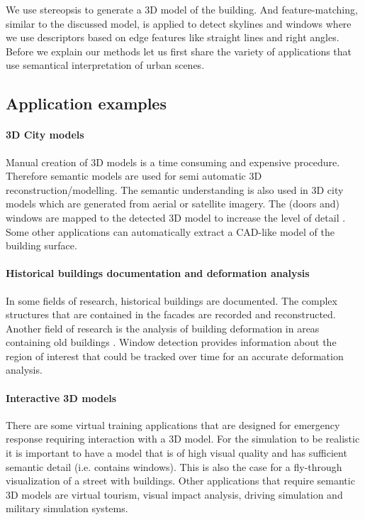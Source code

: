We use stereopsis to generate a 3D model of the building.  And feature-matching,
similar to the discussed model, is applied to detect skylines and windows where
we use descriptors based on edge features like straight lines and right angles.
Before we explain our methods let us first share the variety of applications 
that use semantical interpretation of urban scenes. 

\newpage
\subsection{Application examples}
\paragraph{3D City models} 
	Manual creation of 3D models is a time consuming and expensive procedure.
	Therefore semantic models are used for semi automatic 3D
	reconstruction/modelling.
	The semantic understanding is also used in 3D city models which are
	generated from aerial or satellite imagery.  The (doors and) windows are mapped to the detected 3D model to increase the level of detail \cite{Muller_procedural2}. 
	Some other applications can automatically extract a CAD-like model of
	the building surface.

\paragraph{Historical buildings documentation and deformation analysis}
	In some fields of research, historical buildings are documented.  The complex
	structures that are contained in the facades are recorded and reconstructed.
	Another field of research is the analysis of building deformation in areas
	containing old buildings \cite{deformation}.
	 Window detection provides information about the
	region of interest that could be tracked over time for an accurate
	deformation analysis.

\paragraph{Interactive 3D models}
	There are some virtual training applications that are designed for
	emergency response requiring interaction with a 3D model.  
	For the simulation to be realistic it is important to have a model that is
	of high visual quality and has sufficient semantic detail (i.e. contains
	windows).  This is also the case for a fly-through visualization of a street with
	buildings.
	Other applications that require semantic 3D models are virtual tourism,
	visual impact analysis, driving simulation and military simulation systems.

